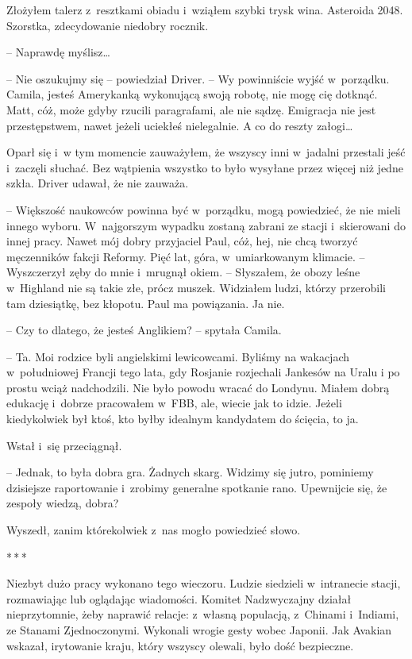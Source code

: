 \documentclass[oneside,polish,12pt,sfheadings]{mwbk}
\newcommand{\threeast}{\bigskip\par\centerline{*\,*\,*}\medskip\par}%
\begin{document}
Złożyłem talerz z~resztkami obiadu i~wziąłem szybki trysk wina.
Asteroida 2048. Szorstka, zdecydowanie niedobry rocznik.

-- Naprawdę myślisz\ldots

-- Nie oszukujmy się -- powiedział Driver. -- Wy powinniście wyjść w~porządku. Camila, jesteś Amerykanką wykonującą swoją robotę, nie mogę
cię dotknąć. Matt, cóż, może gdyby rzucili paragrafami, ale nie sądzę.
Emigracja nie jest przestępstwem, nawet jeżeli uciekłeś nielegalnie. A
co do reszty załogi\ldots

Oparł się i~w tym momencie zauważyłem, że wszyscy inni w~jadalni
przestali jeść i~zaczęli słuchać. Bez wątpienia wszystko to było
wysyłane przez więcej niż jedne szkła. Driver udawał, że nie zauważa.

-- Większość naukowców powinna być w~porządku, mogą powiedzieć, że nie
mieli innego wyboru. W~najgorszym wypadku zostaną zabrani ze stacji i~skierowani do innej pracy. Nawet mój dobry przyjaciel Paul, cóż, hej,
nie chcą tworzyć męczenników fakcji Reformy. Pięć lat, góra, w~umiarkowanym klimacie. -- Wyszczerzył zęby do mnie i~mrugnął okiem. --
Słyszałem, że obozy leśne w~Highland nie są takie złe, prócz muszek.
Widziałem ludzi, którzy przerobili tam dziesiątkę, bez kłopotu. Paul ma
powiązania. Ja nie.

-- Czy to dlatego, że jesteś Anglikiem? -- spytała Camila.

-- Ta. Moi rodzice byli angielskimi lewicowcami. Byliśmy na wakacjach w~południowej Francji tego lata, gdy Rosjanie rozjechali Jankesów na Uralu
i po prostu wciąż nadchodzili. Nie było powodu wracać do Londynu. Miałem
dobrą edukację i~dobrze pracowałem w~FBB, ale, wiecie jak to idzie.
Jeżeli kiedykolwiek był ktoś, kto byłby idealnym kandydatem do ścięcia,
to ja.

Wstał i~się przeciągnął. 

-- Jednak, to była dobra gra. Żadnych skarg.
Widzimy się jutro, pominiemy dzisiejsze raportowanie i~zrobimy generalne
spotkanie rano. Upewnijcie się, że zespoły wiedzą, dobra?

Wyszedł, zanim którekolwiek z~nas mogło powiedzieć słowo.

\threeast

Niezbyt dużo pracy wykonano tego wieczoru. Ludzie siedzieli w~intranecie
stacji, rozmawiając lub oglądając wiadomości. Komitet Nadzwyczajny
działał nieprzytomnie, żeby naprawić relacje: z~własną populacją, z~Chinami i~Indiami, ze Stanami Zjednoczonymi. Wykonali wrogie gesty wobec
Japonii. Jak Avakian wskazał, irytowanie kraju, który wszyscy olewali,
było dość bezpieczne.
\end{document}
